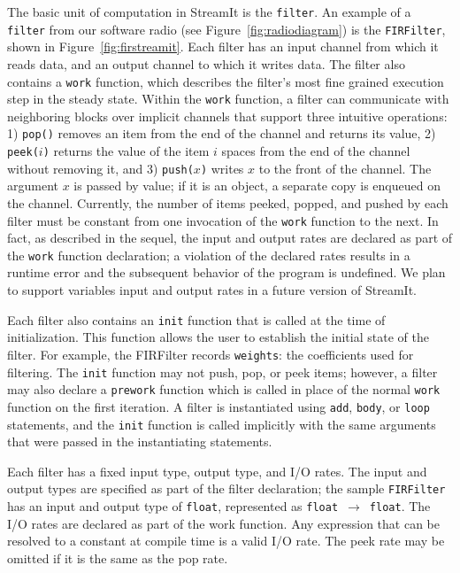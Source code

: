 The basic unit of computation  in StreamIt is the \texttt{filter}.  An
example   of  a   \texttt{filter}   from  our   software  radio   (see
Figure~\ref{fig:radiodiagram})  is  the  \texttt{FIRFilter}, shown  in
Figure~\ref{fig:firstreamit}.  Each  filter has an  input channel from
which it  reads data, and an  output channel to which  it writes data.
The filter also contains a \texttt{work} function, which describes the
filter's most fine grained execution step in the steady state.  Within
the \texttt{work} function, a  filter can communicate with neighboring
blocks over implicit channels that support three intuitive operations:
1) \texttt{pop()}  removes an  item from  the end  of the  channel and
returns its value, 2) \texttt{peek($i$)} returns the value of the item
$i$ spaces  from the end  of the channel  without removing it,  and 3)
\texttt{push($x$)}  writes  $x$ to  the  front  of  the channel.   The
argument $x$ is  passed by value; if it is an  object, a separate copy
is enqueued  on the  channel. Currently, the  number of  items peeked,
popped, and pushed by each filter must be constant from one invocation
of the \texttt{work}  function to the next.  In  fact, as described in
the sequel,  the input and  output rates are  declared as part  of the
\texttt{work} function declaration; a  violation of the declared rates
results in a runtime error  and the subsequent behavior of the program
is undefined. We plan to support variables input and output rates in a
future version of StreamIt.

Each filter also contains an  \texttt{init} function that is called at
the  time  of  initialization.   This  function  allows  the  user  to
establish the initial state of the filter.  For example, the FIRFilter
records  \texttt{weights}: the coefficients  used for  filtering.  The
\texttt{init} function  may not push,  pop, or peek items;  however, a
filter may also declare a \texttt{prework} function which is called in
place of the normal \texttt{work}  function on the first iteration.  A
filter   is  instantiated   using   \texttt{add},  \texttt{body},   or
\texttt{loop}  statements, and  the \texttt{init}  function  is called
implicitly  with   the  same  arguments   that  were  passed   in  the
instantiating statements.

Each filter has  a fixed input type, output type,  and I/O rates.  The
input  and  output   types  are  specified  as  part   of  the  filter
declaration;  the sample  \texttt{FIRFilter} has  an input  and output
type         of         \texttt{float},         represented         as
\texttt{float}~$\rightarrow$~\texttt{float}.   The I/O rates  are declared
as part of the work function.   Any expression that can be resolved to
a constant at compile time is a  valid I/O rate.  The peek rate may be
omitted if it is the same as the pop rate.

